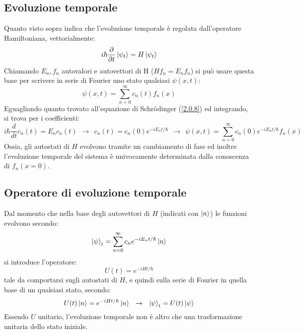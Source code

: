 \documentclass[twoside]{article}
\begin{document}
\subsection{Evoluzione temporale}
Quanto visto sopra indica che l'evoluzione temporale è regolata dall'operatore Hamiltoniana, vettorialmente:
\begin{equation}
    i\hbar\frac{\partial}{\partial t}\ket{\psi_t}=H\ket{\psi_t}
\end{equation}
Chiamando $E_n , f_n$ autovalori e autovettori di H ($Hf_n = E_n f_n$) si può usare questa base per scrivere in serie di Fourier uno stato qualsiasi $\psi(x,t)$:
\begin{equation}
    \psi(x,t)=\displaystyle\sum_{n=0}^{\infty} c_n (t)f_n (x)
\end{equation}
Eguagliando quanto trovato all'equazione di Schr\"odinger (\ref{2.0.8}) ed integrando, si trova per i coefficienti:
\begin{equation}
 i\hbar \frac{d}{dt}c_n (t)=E_n c_n (t)   \ \ \rightarrow \ \  c_n (t)=c_n (0) e^{-i E_n t/\hbar} \ \ \rightarrow \ \  \psi (x,t)=\displaystyle\sum_{n=0}^{\infty} c_n (0) e^{-i E_n t/\hbar} f_n (x)
\end{equation}
Ossia, gli autostati di $H$ evolvono tramite un cambiamento di fase ed inoltre l'evoluzione temporale del sistema è univocamente determinata dalla conoscenza di $f_n (x=0)$.

\vspace{0.5cm}

\subsection{Operatore di evoluzione temporale}
Dal momento che nella base degli autovettori di $H$ (indicati con $\ket{n}$) le funzioni evolvono secondo:
\begin{equation}
    \ket{\psi}_t = \displaystyle\sum_{n=0}^{\infty} c_n e^{-iE_n t/\hbar}\ket{n}
\end{equation}
si introduce l'operatore:
\begin{equation}
    U(t)=e^{-iHt/\hbar}
\end{equation}
tale da comportarsi sugli autostati di $H$, e quindi sulla serie di Fourier in quella base di un qualsiasi stato, secondo:
\begin{equation}
    U(t)\ket{n}=e^{-iHt/\hbar} \ket{n} \ \ \rightarrow \ \ \ket{\psi}_t = U(t)\ket{\psi}
\end{equation}
Essendo $U$ unitario, l'evoluzione temporale non è altro che una trasformazione unitaria dello stato iniziale.
\end{document}
